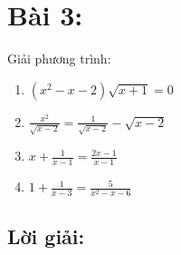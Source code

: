 \section*{Bài 3:}
Giải phương trình:
\begin{enumerate}[label=(\alph*)]
\item $(x^2 - x - 2)\sqrt{x+1} = 0$
\item $\frac{x^2}{\sqrt{x-2}}=\frac{1}{\sqrt{x-2}} - \sqrt{x-2}$
\item $x + \frac{1}{x-1} = \frac{2x-1}{x-1}$
\item $1 + \frac{1}{x-3} = \frac{5}{x^2-x-6}$
\end{enumerate}

\subsection*{Lời giải:}
